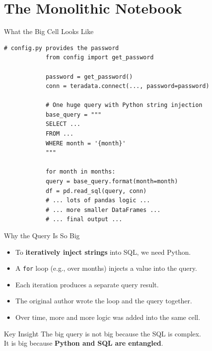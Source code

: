 \documentclass[aspectratio=169,11pt]{beamer}
\begin{document}
	\section{The Monolithic Notebook}
	
	\begin{frame}[fragile]{What the Big Cell Looks Like}
		\begin{lstlisting}[caption={Conceptual structure of the monolithic cell}]
			# config.py provides the password
			from config import get_password
			
			password = get_password()
			conn = teradata.connect(..., password=password)
			
			# One huge query with Python string injection
			base_query = """
			SELECT ...
			FROM ...
			WHERE month = '{month}'
			"""
			
			for month in months:
			query = base_query.format(month=month)
			df = pd.read_sql(query, conn)
			# ... lots of pandas logic ...
			# ... more smaller DataFrames ...
			# ... final output ...
		\end{lstlisting}
	\end{frame}
	
	\begin{frame}{Why the Query Is So Big}
		\begin{itemize}
			\item To \textbf{iteratively inject strings} into SQL, we need Python.
			\item A \texttt{for} loop (e.g., over months) injects a value into the query.
			\item Each iteration produces a separate query result.
			\item The original author wrote the loop and the query together.
			\item Over time, more and more logic was added into the same cell.
		\end{itemize}
		
		\begin{block}{Key Insight}
			The big query is not big because the SQL is complex.\\
			It is big because \textbf{Python and SQL are entangled}.
		\end{block}
	\end{frame}
	
\end{document}

